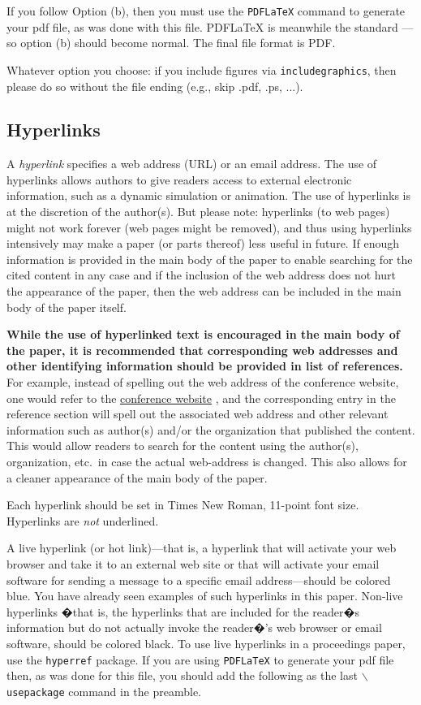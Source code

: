 \documentclass{wscpaperproc}
\theoremstyle{wsc}
\begin{document}
If you follow Option (b), then you must use the {\tt PDFLaTeX} command to generate your pdf file, as was done with this file. PDFLaTeX is meanwhile the standard --- so option (b) should become normal. The final file format is PDF.

Whatever option you choose: if you include figures via {\tt includegraphics}, then please do so without the file ending (e.g., skip .pdf, .ps, ...).

\subsection{Hyperlinks}
\label{sec: hyper}
A {\em hyperlink} specifies a web address (URL) or an email address.
The use of hyperlinks allows authors to give readers access to external electronic information, such as a dynamic simulation or animation.
The use of hyperlinks is at the discretion of the author(s).
But please note: hyperlinks (to web pages) might not work forever (web pages might be removed), and thus using hyperlinks intensively may make a paper (or parts thereof) less useful in future.
If enough information is provided in the main body of the paper to enable searching for the cited content in any case and if the inclusion of the web address does not hurt the appearance of the paper, then the web address can be included in the main body of the paper itself.

{\bf While the use of hyperlinked text is encouraged in the main body of the paper, it is recommended that corresponding web addresses and other identifying information should be provided in list of references.}
For example, instead of spelling out the web address of the conference website, one would refer to the  \href{http://www.wintersim.org}{conference website} \cite{WSC}, and the corresponding entry in the reference section will spell out the associated web address and other relevant information such as author(s) and/or the organization that published the content.
This would allow readers to search for the content using the author(s), organization, etc.\ in case the actual web-address is changed.  This also allows for a cleaner appearance of the main body of the paper.

Each hyperlink should be set in Times New Roman, 11-point font size.
Hyperlinks are {\em not} underlined.

A live hyperlink (or hot link)---that is, a hyperlink that will activate your web browser and take it to an external web site or that will activate your email software for sending a message to a specific email address---should be colored blue. You have already seen examples of such hyperlinks in this paper.
Non-live hyperlinks �that is, the hyperlinks that are included for the reader�s information but do not actually invoke the reader�'s web browser or email software, should be colored black.
To use live hyperlinks in a proceedings paper, use the {\tt hyperref} package. If you are using {\tt PDFLaTeX} to generate your pdf file then, as
was done for this file, you should add the following as the last {\tt $\backslash$usepackage} command in the preamble.\newline
\end{document}
